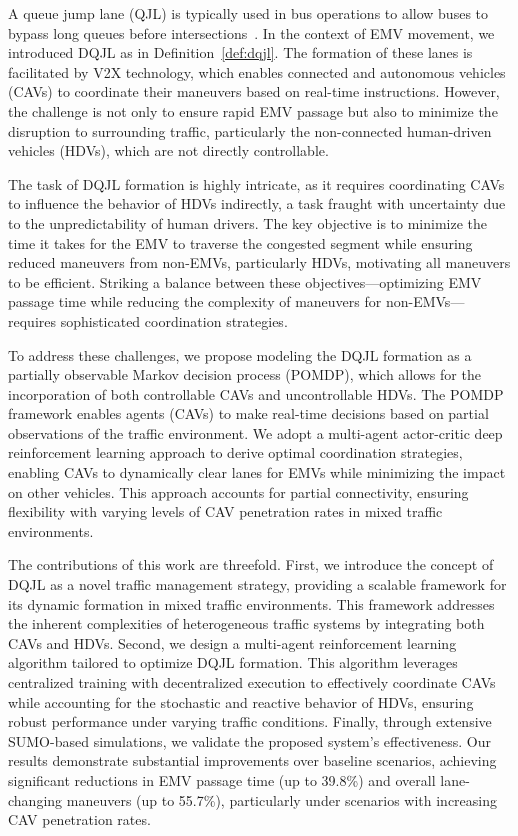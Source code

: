 A queue jump lane (QJL) is typically used in bus operations to allow buses to bypass long queues before intersections~\cite{Zhou2005Performance,Cesme2015Queue}. 
In the context of EMV movement, we introduced DQJL as in Definition~\ref{def:dqjl}. The formation of these lanes is facilitated by V2X technology, which enables connected and autonomous vehicles (CAVs) to coordinate their maneuvers based on real-time instructions. However, the challenge is not only to ensure rapid EMV passage but also to minimize the disruption to surrounding traffic, particularly the non-connected human-driven vehicles (HDVs), which are not directly controllable.

The task of DQJL formation is highly intricate, as it requires coordinating CAVs to influence the behavior of HDVs indirectly, a task fraught with uncertainty due to the unpredictability of human drivers. The key objective is to minimize the time it takes for the EMV to traverse the congested segment while ensuring reduced maneuvers from non-EMVs, particularly HDVs, motivating all maneuvers to be efficient. Striking a balance between these objectives—optimizing EMV passage time while reducing the complexity of maneuvers for non-EMVs—requires sophisticated coordination strategies.

To address these challenges, we propose modeling the DQJL formation as a partially observable Markov decision process (POMDP), which allows for the incorporation of both controllable CAVs and uncontrollable HDVs. The POMDP framework enables agents (CAVs) to make real-time decisions based on partial observations of the traffic environment. We adopt a multi-agent actor-critic deep reinforcement learning approach to derive optimal coordination strategies, enabling CAVs to dynamically clear lanes for EMVs while minimizing the impact on other vehicles. This approach accounts for partial connectivity, ensuring flexibility with varying levels of CAV penetration rates in mixed traffic environments.

The contributions of this work are threefold. First, we introduce the concept of DQJL as a novel traffic management strategy, providing a scalable framework for its dynamic formation in mixed traffic environments. This framework addresses the inherent complexities of heterogeneous traffic systems by integrating both CAVs and HDVs. Second, we design a multi-agent reinforcement learning algorithm tailored to optimize DQJL formation. This algorithm leverages centralized training with decentralized execution to effectively coordinate CAVs while accounting for the stochastic and reactive behavior of HDVs, ensuring robust performance under varying traffic conditions. Finally, through extensive SUMO-based simulations, we validate the proposed system’s effectiveness. Our results demonstrate substantial improvements over baseline scenarios, achieving significant reductions in EMV passage time (up to 39.8\%) and overall lane-changing maneuvers (up to 55.7\%), particularly under scenarios with increasing CAV penetration rates.


